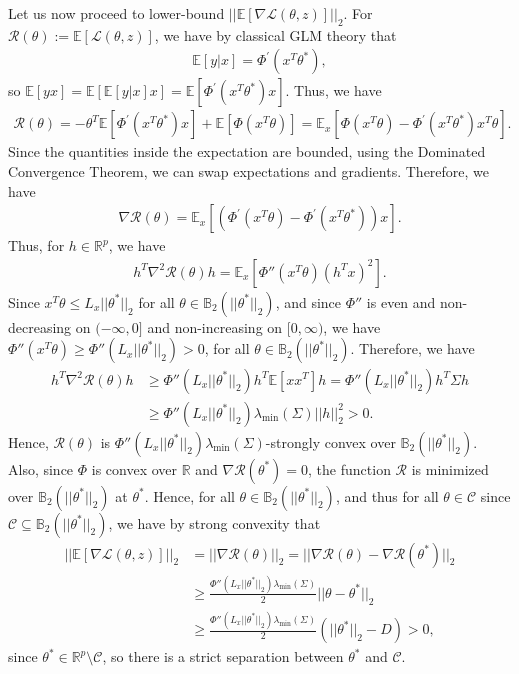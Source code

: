 \documentclass{article}
\begin{document}
Let us now proceed to lower-bound $||\mathbb{E}[\nabla \mathcal{L}(\theta, z)]||_2$. For $\mathcal{R}(\theta) := \mathbb{E}[\mathcal{L}(\theta, z)]$, we have by classical GLM theory that
\begin{align*}
\mathbb{E}[y|x] = \Phi^{'}(x^T\theta^*),
\end{align*}
so $\mathbb{E}[yx] = \mathbb{E}\left[\mathbb{E}[y|x]x\right] = \mathbb{E}[\Phi^{'}(x^T\theta^*)x]$. Thus, we have
\begin{align*}
\mathcal{R}(\theta) = -\theta^T\mathbb{E}[\Phi^{'}(x^T\theta^*)x] + \mathbb{E}[\Phi(x^T\theta)] = \mathbb{E}_{x}[\Phi(x^T\theta) - \Phi^{'}(x^T\theta^*)x^T\theta].
\end{align*}
Since the quantities inside the expectation are bounded, using the Dominated Convergence Theorem, we can swap expectations and gradients. Therefore, we have
\begin{align*}
\nabla \mathcal{R}(\theta) = \mathbb{E}_{x}[(\Phi^{'}(x^T\theta) - \Phi^{'}(x^T\theta^*))x].
\end{align*}
Thus, for $h \in \mathbb{R}^p$, we have
\begin{align*}
h^T\nabla^2\mathcal{R}(\theta)h = \mathbb{E}_x[\Phi''(x^T\theta)(h^Tx)^2].
\end{align*}
Since $x^T\theta \leq L_x||\theta^*||_2$ for all $\theta \in \mathbb{B}_2\left(||\theta^*||_2\right)$, and since $\Phi''$ is even and non-decreasing on $(-\infty, 0]$ and non-increasing on $[0, \infty)$, we have $\Phi''(x^T\theta) \geq \Phi''\left(L_x||\theta^*||_2\right) > 0$, for all $\theta \in \mathbb{B}_2(||\theta^*||_2)$. Therefore, we have
\begin{align*}
h^T\nabla^2\mathcal{R}(\theta)h &\geq \Phi''\left(L_x||\theta^*||_2\right)h^T\mathbb{E}[xx^T]h = \Phi''(L_x||\theta^*||_2)h^T\Sigma h\\
&\geq \Phi''\left(L_x||\theta^*||_2\right)\lambda_{\min}(\Sigma)||h||_2^2 > 0.
\end{align*}
Hence, $\mathcal{R}(\theta)$ is $\Phi''\left(L_x||\theta^*||_2\right)\lambda_{\min}(\Sigma)$-strongly convex over $\mathbb{B}_2\left(||\theta^*||_2\right)$. Also, since $\Phi$ is convex over $\mathbb{R}$ and $\nabla \mathcal{R}(\theta^{*}) = 0$, the function $\mathcal{R}$ is minimized over $\mathbb{B}_2\left(||\theta^*||_2\right)$ at $\theta^{*}$. Hence, for all $\theta \in \mathbb{B}_2\left(||\theta^*||_2\right)$, and thus for all $\theta \in \mathcal{C}$ since $\mathcal{C} \subseteq \mathbb{B}_2\left(||\theta^*||_2\right)$, we have by strong convexity that
\begin{align*}
||\mathbb{E}[\nabla \mathcal{L}(\theta, z)]||_2 &= ||\nabla\mathcal{R}(\theta)||_2 = ||\nabla\mathcal{R}(\theta) - \nabla\mathcal{R}(\theta^*)||_2\\
&\geq \frac{\Phi''\left(L_x||\theta^*||_2\right)\lambda_{\min}(\Sigma)}{2}||\theta - \theta^{*}||_2\\ &\geq \frac{\Phi''\left(L_x||\theta^*||_2\right)\lambda_{\min}(\Sigma)}{2}\left(||\theta^*||_2 - D\right) > 0,
\end{align*}
since $\theta^* \in \mathbb{R}^p \setminus \mathcal{C}$, so there is a strict separation between $\theta^*$ and $\mathcal{C}$.
\end{document}
